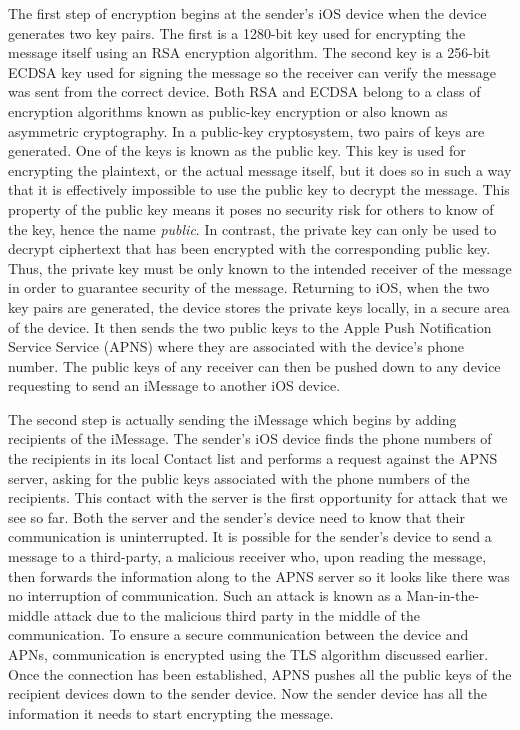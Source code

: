 The first step of encryption begins at the sender's iOS device when the device
generates two key pairs\cite{apple}.  The first is a 1280-bit key used for encrypting the
message itself using an RSA encryption algorithm.  The second key is a 256-bit
ECDSA key used for signing the message so the receiver can verify the message
was sent from the correct device.  Both RSA and ECDSA 
belong to a class of encryption algorithms known as public-key encryption or
also known as asymmetric cryptography\cite{trappe}. In a public-key cryptosystem, two pairs
of keys are generated.  One of the keys is known as the public key.  This key
is used for encrypting the plaintext, or the actual message itself, but it does
so in such a way that it is effectively impossible to use the public key to
decrypt the message.  This property of the public key means it poses no
security risk for others to know of the key, hence the name \textit{public}.  In
contrast, the private key can only be used to decrypt ciphertext that has been
encrypted with the corresponding public key.  Thus, the private key must be
only known to the intended receiver of the message in order to guarantee
security of the message.  Returning to iOS, when the two key pairs are
generated, the device stores the private keys locally, in a secure area of the
device.  It then sends the two public keys to the Apple Push Notification
Service Service (APNS) where they are associated with the device's phone number.
The public keys of any receiver can then be pushed down to any device
requesting to send an iMessage to another iOS device\cite{apple}.

The second step is actually sending the iMessage which begins by adding
recipients of the iMessage.  The sender's iOS device finds the phone numbers of
the recipients in its local Contact list and performs a request against the
APNS server, asking for the public keys associated with the phone numbers of
the recipients\cite{apple}.  This contact with the server is the first opportunity for
attack that we see so far.  Both the server and the sender's device need to
know that their communication is uninterrupted.  It is possible for the
sender's device to send a message to a third-party, a malicious receiver who,
upon reading the message, then forwards the information along to the APNS
server so it looks like there was no interruption of communication.  Such an
attack is known as a Man-in-the-middle attack due to the malicious third party
in the middle of the communication\cite{quarkslab}.  To ensure a secure communication between
the device and APNs, communication is encrypted using the TLS algorithm
discussed earlier\cite{apple}.  Once the connection has been established, APNS pushes all
the public keys of the recipient devices down to the sender device.  Now the
sender device has all the information it needs to start encrypting the message.

